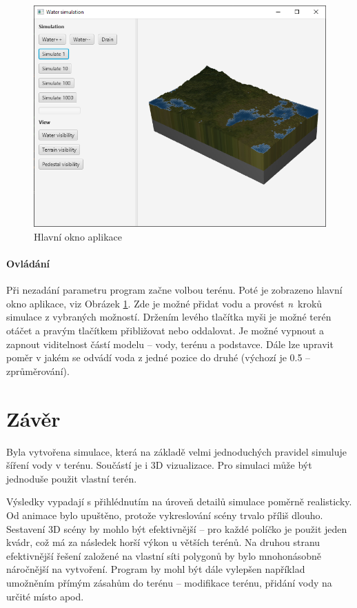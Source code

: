 \documentclass[12pt, a4paper]{article}
\begin{document}
\begin{figure}
	\centering
	\includegraphics[width=0.9\linewidth]{gui}
	\caption{Hlavní okno aplikace}
	\label{fig:gui}
\end{figure}

\paragraph{Ovládání}
Při nezadání parametru program začne volbou terénu.
Poté je zobrazeno hlavní okno aplikace, viz Obrázek \ref{fig:gui}.
Zde je možné přidat vodu a provést \emph{n}~kroků simulace z vybraných možností.
Držením levého tlačítka myši je možné terén otáčet a pravým tlačítkem přibližovat nebo oddalovat.
Je možné vypnout a zapnout viditelnost částí modelu -- vody, terénu a podstavce.
Dále lze upravit poměr v jakém se odvádí voda z jedné pozice do druhé (výchozí je 0.5 -- zprůměrování).

\section*{Závěr}
Byla vytvořena simulace, která na základě velmi jednoduchých pravidel simuluje šíření vody v terénu.
Součástí je i 3D vizualizace.
Pro simulaci může být jednoduše použit vlastní terén.

Výsledky vypadají s přihlédnutím na úroveň detailů simulace poměrně realisticky.
Od animace bylo upuštěno, protože vykreslování scény trvalo příliš dlouho.
Sestavení 3D scény by mohlo být efektivnější -- pro každé políčko je použit jeden kvádr, což má za následek horší výkon u větších terénů.
Na druhou stranu efektivnější řešení založené na vlastní síti polygonů by bylo mnohonásobně náročnější na vytvoření.
Program by mohl být dále vylepšen například umožněním přímým zásahům do terénu -- modifikace terénu, přidání vody na určité místo apod.


% 
% 

% 
\end{document}
